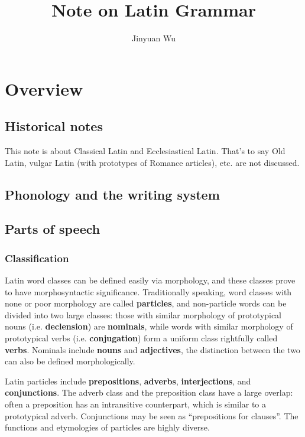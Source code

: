 \documentclass[UTF8, a4paper, oneside]{report}
\title{Note on Latin Grammar}
\author{Jinyuan Wu}
\newcommand*{\concept}[1]{\textbf{#1}}
\begin{document}
\maketitle

\chapter{Overview}

\section{Historical notes}

This note is about Classical Latin and Ecclesiastical Latin.
That's to say Old Latin, vulgar Latin (with prototypes of Romance articles), etc.
are not discussed.

\section{Phonology and the writing system}

\section{Parts of speech}

\subsection{Classification}

Latin word classes can be defined easily via morphology,
and these classes prove to have morphosyntactic significance.
Traditionally speaking, 
word classes with none or poor morphology are called \concept{particles},
and non-particle words can be divided into two large classes:
those with similar morphology of prototypical nouns (i.e. \concept{declension}) are \concept{nominals},
while words with similar morphology of prototypical verbs (i.e. \concept{conjugation})
form a uniform class rightfully called \concept{verbs}.
Nominals include \concept{nouns} and \concept{adjectives},
the distinction between the two can also be defined morphologically.

Latin particles include \concept{prepositions}, \concept{adverbs},
\concept{interjections}, and \concept{conjunctions}.
The adverb class and the preposition class have a large overlap:
often a preposition has an intransitive counterpart,
which is similar to a prototypical adverb.
Conjunctions may be seen as ``prepositions for clauses''.
The functions and etymologies of particles are highly diverse.
\end{document}

